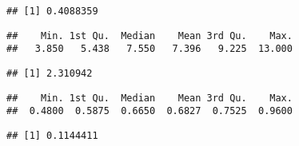\documentclass[
]{article}
\newenvironment{Shaded}{\begin{snugshade}}{\end{snugshade}}
\newcommand{\DataTypeTok}[1]{\textcolor[rgb]{0.13,0.29,0.53}{#1}}
\newcommand{\KeywordTok}[1]{\textcolor[rgb]{0.13,0.29,0.53}{\textbf{#1}}}
\newcommand{\NormalTok}[1]{#1}
\newcommand{\OperatorTok}[1]{\textcolor[rgb]{0.81,0.36,0.00}{\textbf{#1}}}
\newcommand{\StringTok}[1]{\textcolor[rgb]{0.31,0.60,0.02}{#1}}
\begin{document}
\begin{verbatim}
## [1] 0.4088359
\end{verbatim}

\begin{Shaded}
\end{Shaded}

\begin{verbatim}
##    Min. 1st Qu.  Median    Mean 3rd Qu.    Max. 
##   3.850   5.438   7.550   7.396   9.225  13.000
\end{verbatim}

\begin{Shaded}
\end{Shaded}

\begin{verbatim}
## [1] 2.310942
\end{verbatim}

\begin{Shaded}
\end{Shaded}

\begin{verbatim}
##    Min. 1st Qu.  Median    Mean 3rd Qu.    Max. 
##  0.4800  0.5875  0.6650  0.6827  0.7525  0.9600
\end{verbatim}

\begin{Shaded}
\end{Shaded}

\begin{verbatim}
## [1] 0.1144411
\end{verbatim}

\begin{Shaded}
\end{Shaded}
\end{document}
